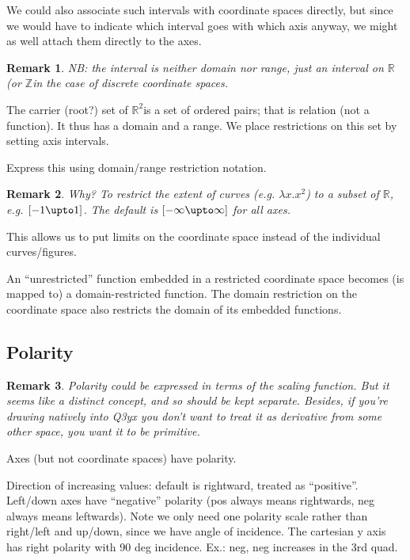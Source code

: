 \documentclass[12pt]{tufte-handout}
\numberwithin{equation}{subsection}
\numberwithin{equation}{subsection}
\newtheorem{remark}{Remark}
\newcommand\cspace{coordinate space}
\newcommand\R{\(\mathds{R}\)}
\newcommand\Rtwo{\(\mathds{R}^2\)}
\newcommand\Z{\(\mathds{Z}\)}
\begin{document}
  We could also associate such intervals with \cspace{}s directly, but
  since we would have to indicate which interval goes with which axis
  anyway, we might as well attach them directly to the axes.

  \begin{remark}
    NB: the interval is neither domain nor range, just an interval on
    \R{} (or \Z in the case of discrete \cspace{}s.
  \end{remark}

  The carrier (root?) set of \Rtwo is a set of ordered pairs; that is
  relation (not a function).  It thus has a domain and a range.  We
  place restrictions on this set by setting axis intervals.

  {\todo Express this using domain/range restriction notation.}

  \begin{remark}
    Why?  To restrict the extent of curves (e.g. \(\lambda x.x^2\)) to
    a subset of \R{}, e.g. \([-1\upto 1]\).  The default is
    \([-\infty\upto\infty]\) for all axes.
  \end{remark}

  This allows us to put limits on the \cspace{} instead of the
  individual curves/figures.

  An ``unrestricted'' function embedded in a restricted \cspace{}
  becomes (is mapped to) a domain-restricted function.  The domain
  restriction on the \cspace{} also restricts the domain of its
  embedded functions.

  \subsection{Polarity}
  \label{subs:polarity}

  \begin{remark}
    Polarity could be expressed in terms of the scaling function.  But
    it seems like a distinct concept, and so should be kept separate.
    Besides, if you're drawing natively into Q3yx you don't want to
    treat it as derivative from some other space, you want it to be
    primitive.
  \end{remark}

  Axes (but not \cspace{}s) have polarity.

  Direction of increasing values: default is rightward, treated as
  ``positive''.  Left/down axes have ``negative'' polarity (pos always
  means rightwards, neg always means leftwards).  Note we only need one
  polarity scale rather than right/left and up/down, since we have angle
  of incidence.  The cartesian y axis has right polarity with 90 deg
  incidence.  Ex.: neg, neg increases in the 3rd quad.
\end{document}
